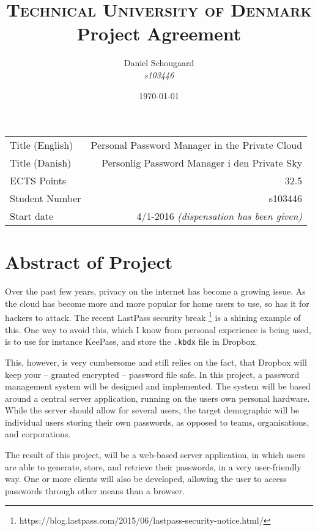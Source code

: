 \documentclass[a4paper,10pt]{article}
\title{	
\textsc{Technical University of Denmark} \\ [25pt] 
\huge Project Agreement
}
\author{Daniel Schougaard \\ \textit{s103446}}
\date{\normalsize\today}
\begin{document}
\maketitle 


\begin{tabular}{ | l | r | }
	Title (English)		&	Personal Password Manager in the Private Cloud			\\
	Title (Danish)		&	Personlig Password Manager i den Private Sky			\\
	ECTS Points			&	32.5													\\
	Student Number		&	s103446													\\
	Start date 			&	4/1-2016 \textit{(dispensation has been given)}			\\
\end{tabular}


\section{Abstract of Project}
	Over the past few years, privacy on the internet has become a growing issue. As the cloud has become more and more popular for home users to use, so has it for hackers to attack. The recent LastPass security break \footnote{https://blog.lastpass.com/2015/06/lastpass-security-notice.html/} is a shining example of this. One way to avoid this, which I know from personal experience is being used, is to use for instance KeePass, and store the \verb=.kbdx= file in Dropbox. 

	This, however, is very cumbersome and still relies on the fact, that Dropbox will keep your -- granted encrypted -- password file safe. In this project, a password management system will be designed and implemented. The system will be based around a central server application, running on the users own personal hardware. While the server should allow for several users, the target demographic will be individual users storing their own passwords, as opposed to teams, organisations, and corporations. 


	The result of this project, will be a web-based server application, in which users are able to generate, store, and retrieve their passwords, in a very user-friendly way. One or more clients will also be developed, allowing the user to access passwords through other means than a browser.
\end{document}
